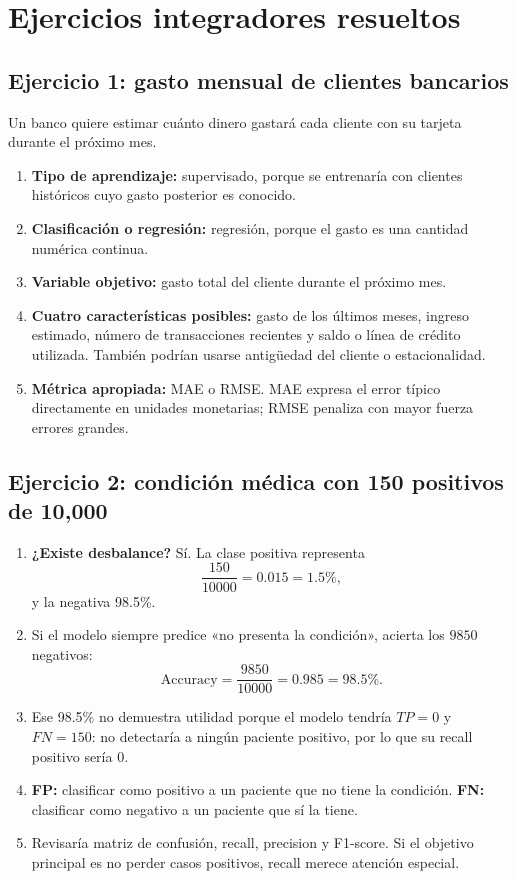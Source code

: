 \documentclass[11pt]{article}
\begin{document}
\newpage
\section{Ejercicios integradores resueltos}

\subsection{Ejercicio 1: gasto mensual de clientes bancarios}
Un banco quiere estimar cuánto dinero gastará cada cliente con su tarjeta durante el próximo mes.

\begin{enumerate}[label=\alph*)]
\item \textbf{Tipo de aprendizaje:} supervisado, porque se entrenaría con clientes históricos cuyo gasto posterior es conocido.
\item \textbf{Clasificación o regresión:} regresión, porque el gasto es una cantidad numérica continua.
\item \textbf{Variable objetivo:} gasto total del cliente durante el próximo mes.
\item \textbf{Cuatro características posibles:} gasto de los últimos meses, ingreso estimado, número de transacciones recientes y saldo o línea de crédito utilizada. También podrían usarse antigüedad del cliente o estacionalidad.
\item \textbf{Métrica apropiada:} MAE o RMSE. MAE expresa el error típico directamente en unidades monetarias; RMSE penaliza con mayor fuerza errores grandes.
\end{enumerate}

\subsection{Ejercicio 2: condición médica con 150 positivos de 10,000}

\begin{enumerate}[label=\alph*)]
\item \textbf{¿Existe desbalance?} Sí. La clase positiva representa
\[
\frac{150}{10000}=0.015=1.5\%,
\]
y la negativa 98.5\%.
\item Si el modelo siempre predice «no presenta la condición», acierta los $9850$ negativos:
\[
\mathrm{Accuracy}=\frac{9850}{10000}=0.985=98.5\%.
\]
\item Ese 98.5\% no demuestra utilidad porque el modelo tendría $TP=0$ y $FN=150$: no detectaría a ningún paciente positivo, por lo que su recall positivo sería $0$.
\item \textbf{FP:} clasificar como positivo a un paciente que no tiene la condición. \textbf{FN:} clasificar como negativo a un paciente que sí la tiene.
\item Revisaría matriz de confusión, recall, precision y F1-score. Si el objetivo principal es no perder casos positivos, recall merece atención especial.
\end{enumerate}
\end{document}
